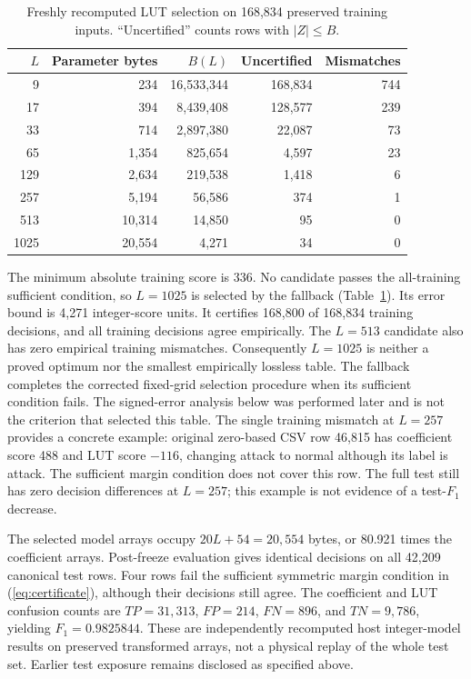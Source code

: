 \documentclass{ieeeaccess}
\begin{document}
\begin{table}[t]
\caption{Freshly recomputed LUT selection on 168,834 preserved training inputs. ``Uncertified'' counts rows with $|Z|\leq B$.}
\label{tab:lut}
\centering\footnotesize\setlength{\tabcolsep}{4pt}
\begin{tabular}{rrrrr}
\toprule
$L$ & Parameter bytes & $B(L)$ & Uncertified & Mismatches\\
\midrule
9 & 234 & 16,533,344 & 168,834 & 744\\
17 & 394 & 8,439,408 & 128,577 & 239\\
33 & 714 & 2,897,380 & 22,087 & 73\\
65 & 1,354 & 825,654 & 4,597 & 23\\
129 & 2,634 & 219,538 & 1,418 & 6\\
257 & 5,194 & 56,586 & 374 & 1\\
513 & 10,314 & 14,850 & 95 & 0\\
1025 & 20,554 & 4,271 & 34 & 0\\
\bottomrule
\end{tabular}
\end{table}

The minimum absolute training score is 336. No candidate passes the all-training sufficient condition, so $L=1025$ is selected by the fallback (Table~\ref{tab:lut}). Its error bound is 4,271 integer-score units. It certifies 168,800 of 168,834 training decisions, and all training decisions agree empirically. The $L=513$ candidate also has zero empirical training mismatches. Consequently $L=1025$ is neither a proved optimum nor the smallest empirically lossless table. The fallback completes the corrected fixed-grid selection procedure when its sufficient condition fails. The signed-error analysis below was performed later and is not the criterion that selected this table. The single training mismatch at $L=257$ provides a concrete example: original zero-based CSV row 46,815 has coefficient score 488 and LUT score $-116$, changing attack to normal although its label is attack. The sufficient margin condition does not cover this row. The full test still has zero decision differences at $L=257$; this example is not evidence of a test-$F_1$ decrease.

The selected model arrays occupy $20L+54=20,554$ bytes, or 80.921 times the coefficient arrays. Post-freeze evaluation gives identical decisions on all 42,209 canonical test rows. Four rows fail the sufficient symmetric margin condition in (\ref{eq:certificate}), although their decisions still agree. The coefficient and LUT confusion counts are $TP=31,313$, $FP=214$, $FN=896$, and $TN=9,786$, yielding $F_1=0.9825844$. These are independently recomputed host integer-model results on preserved transformed arrays, not a physical replay of the whole test set. Earlier test exposure remains disclosed as specified above.
\end{document}
